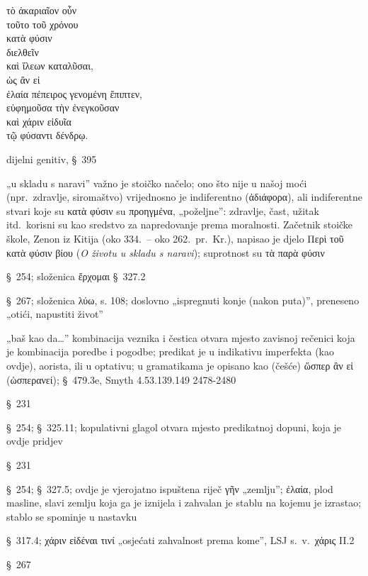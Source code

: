 {\large
\begin{greek}
\noindent τὸ ἀκαριαῖον οὖν \\
τοῦτο τοῦ χρόνου \\
\tabto{2em} κατὰ φύσιν \\
διελθεῖν \\
καὶ ἵλεων καταλῦσαι, \\
ὡς ἂν εἰ \\
\tabto{2em} ἐλαία πέπειρος γενομένη ἔπιπτεν, \\
\tabto{4em} εὐφημοῦσα τὴν ἐνεγκοῦσαν \\
\tabto{4em} καὶ χάριν εἰδυῖα \\
\tabto{6em} τῷ φύσαντι δένδρῳ.\\

\end{greek}
}

\begin{description}[noitemsep,topsep=0pt]
\item[τοῦτο τοῦ χρόνου] dijelni genitiv, §~395
\item[κατὰ φύσιν] „u skladu s naravi” važno je stoičko načelo; ono što nije u našoj moći (npr.\ zdravlje, siromaštvo) vrijednosno je indiferentno (ἀδιάφορα), ali indiferentne stvari koje su κατὰ φύσιν su προηγμένα, „poželjne”: zdravlje, čast, užitak itd.\ korisni su kao sredstvo za napredovanje prema moralnosti. Začetnik stoičke škole, Zenon iz Kitija (oko 334.\ – oko 262.\ pr.~Kr.), napisao je djelo \textgreek{Περὶ τοῦ κατὰ φύσιν βίου} (\textit{O životu u skladu s naravi}); suprotnost su τὰ παρὰ φύσιν
\item[διελθεῖν] §~254; složenica ἔρχομαι §~327.2
\item[καταλῦσαι] §~267; složenica λύω, s. 108; doslovno „ispregnuti konje (nakon puta)”, preneseno „otići, napustiti život”
\item[ὡς ἂν εἰ] „baš kao da\dots” kombinacija veznika i čestica otvara mjesto zavisnoj rečenici koja je kombinacija poredbe i pogodbe; predikat je u indikativu imperfekta (kao ovdje), aorista, ili u optativu; u gramatikama je opisano kao (češće) ὥσπερ ἂν εἰ (ὡσπερανεί); §~479.3e, Smyth 4.53.139.149 2478-2480
\item[ἔπιπτεν] §~231
\item[πέπειρος γενομένη] §~254; §~325.11; kopulativni glagol otvara mjesto predikatnoj dopuni, koja je ovdje pridjev
\item[εὐφημοῦσα] §~231
\item[τὴν ἐνεγκοῦσαν] §~254; §~327.5; ovdje je vjerojatno ispuštena riječ γῆν
„zemlju”; \textgreek{ἐλαία,} plod masline, slavi zemlju koja ga je iznijela i zahvalan je stablu na kojemu je izrastao; stablo se spominje u nastavku
\item[εἰδυῖα] §~317.4; χάριν εἰδέναι τινί „osjećati zahvalnost prema kome”, LSJ s.~v.\ χάρις II.2
\item[φύσαντι] §~267
\end{description}


